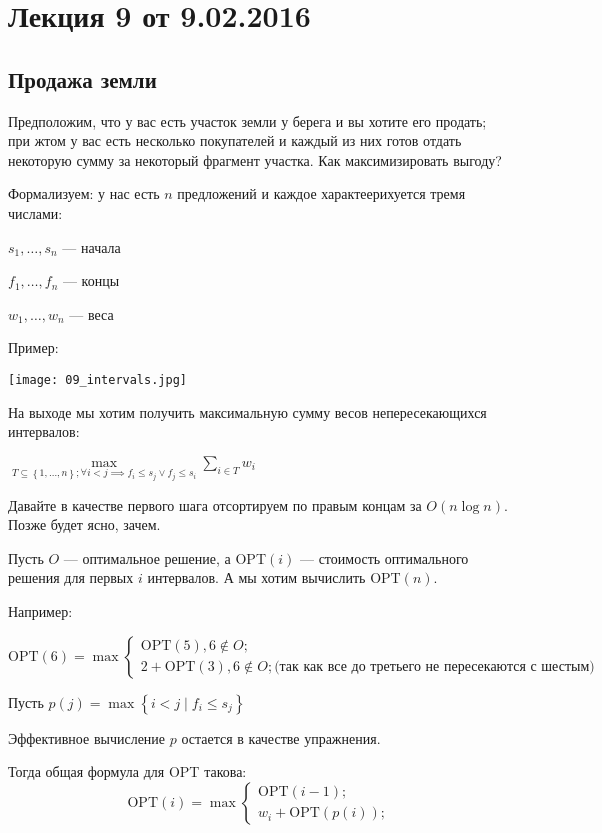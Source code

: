 
\let\epsilent\varepsilon


\section*{Лекция 9 от 9.02.2016}

\subsection{Продажа земли}

Предположим, что у вас есть участок земли у берега и вы хотите его продать; при жтом у вас есть несколько покупателей и каждый из них готов отдать некоторую сумму за некоторый фрагмент участка. Как максимизировать выгоду?

Формализуем: у нас есть $n$ предложений и каждое характеерихуется тремя числами:

$s_1, \ldots, s_n$ --- начала

$f_1, \ldots, f_n$ --- концы

$w_1, \ldots, w_n$ --- веса

Пример:

\texttt{[image: 09\_intervals.jpg]}

На выходе мы хотим получить максимальную сумму весов непересекающихся интервалов:

$\max\limits_{T\subseteq \left\{ 1,\ldots, n \right\}; \forall i<j \implies f_i \leqslant s_j \lor f_j \leqslant s_i} \sum\limits_{i\in T}w_i$

Давайте в качестве первого шага отсортируем по правым концам за $O(n\log n)$. Позже будет ясно, зачем.

Пусть $O$ --- оптимальное решение, а OPT$(i)$ --- стоимость оптимального решения для первых $i$ интервалов. А мы хотим вычислить OPT$(n)$.

Например:

\[
    \mathrm{OPT}(6) = \max\begin{cases}
        \mathrm{OPT}(5), 6\not\in O;\\
        2+ \mathrm{OPT}(3), 6\not\in O; \text{(так как все до третьего не пересекаются с шестым)}
    \end{cases}
\]

Пусть $p(j) = \max\left\{ i<j \mid f_{i}\leqslant s_j\right\}$

Эффективное вычисление $p$ остается в качестве упражнения.

Тогда общая формула для OPT такова:
\[
    \mathrm{OPT}(i) = \max\begin{cases}
        \mathrm{OPT}(i-1);\\
        w_i+ \mathrm{OPT}(p(i));
    \end{cases}
\]

